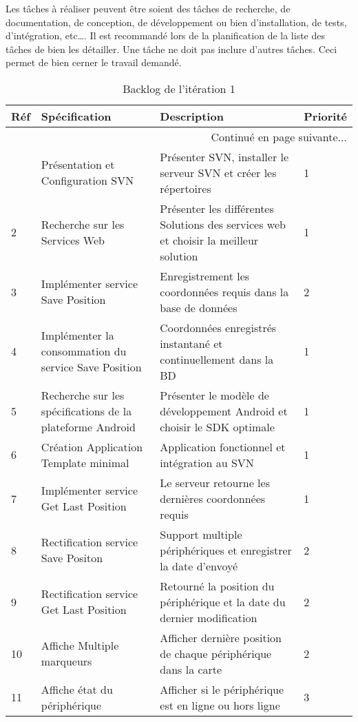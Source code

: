 Les tâches à réaliser peuvent être soient des tâches de recherche, de
documentation, de conception, de développement ou bien d'installation, de
tests, d'intégration, etc\ldots. Il est recommandé lors de la planification de la
liste des tâches de bien les détailler. Une tâche ne doit pas inclure d'autres
tâches. Ceci permet de bien cerner le travail demandé.
\begin{center}
    \footnotesize
    \begin{longtable}{| p{1cm} | p{5cm} | p{7cm} | p{1cm} |}
        \caption{Backlog de l'itération 1}
        \label{tab:sprint1-backlog} \\

 \hline
 \textbf{Réf} & \textbf{Spécification} & \textbf{Description} & \textbf{Priorité} \\ \hline
 \endhead

 \hline \multicolumn{4}{|r|}{{Continué en page suivante$\dotsc$}} \\ \hline
 \endfoot

 \hline \hline
 \endlastfoot

\hline
1 & Présentation et Configuration SVN & Présenter SVN, installer le serveur SVN et créer les répertoires  & 1 \\ \hline
2 & Recherche sur les Services Web & Présenter les différentes Solutions des services web et choisir la meilleur solution & 1 \\ \hline
3 & Implémenter service Save Position & Enregistrement les coordonnées requis dans la base de données & 2 \\ \hline
4 & Implémenter la consommation du service Save Position & Coordonnées enregistrés instantané et continuellement dans la BD & 1 \\ \hline
5 & Recherche sur les spécifications de la plateforme Android & Présenter le modèle de développement Android et choisir le SDK optimale & 1 \\ \hline
6 & Création Application Template minimal & Application fonctionnel et intégration au SVN & 1 \\ \hline
7 & Implémenter service Get Last Position & Le serveur retourne les dernières coordonnées requis & 1 \\ \hline
8 & Rectification service Save Positon & Support multiple périphériques et enregistrer la date d'envoyé & 2 \\ \hline
9 & Rectification service Get Last Position & Retourné la position du périphérique et la date du dernier modification & 2 \\ \hline
10 & Affiche Multiple marqueurs & Afficher dernière position de chaque périphérique dans la carte & 2 \\ \hline
11 & Affiche état du périphérique & Afficher si le périphérique est en ligne ou hors ligne & 3 \\ \hline
\end{longtable}
\end{center}

